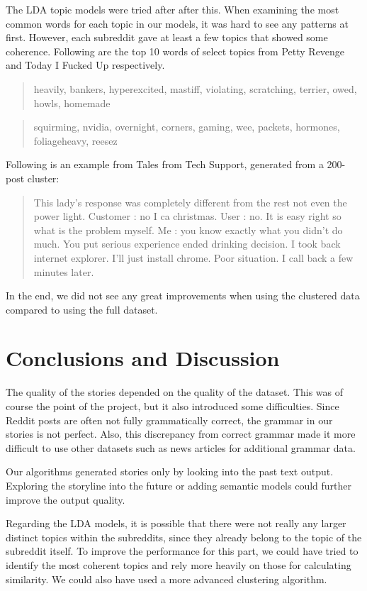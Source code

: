 \documentclass[12pt,a4paper,utf8]{article}
\begin{document}
The LDA topic models were tried after after this. When examining the most common words for each topic in our models, it was hard to see any patterns at first. However, each subreddit gave at least a few topics that showed some coherence. Following are the top 10 words of select topics from Petty Revenge and Today I Fucked Up respectively.
\begin{quotation}
heavily, bankers, hyperexcited, mastiff, violating, scratching, terrier, owed, howls, homemade
\end{quotation}
\begin{quotation}
squirming, nvidia, overnight, corners, gaming, wee, packets, hormones, foliageheavy, reesez
\end{quotation}
Following is an example from Tales from Tech Support, generated from a 200-post cluster:
\begin{quotation}
This lady's response was completely different from the rest not even the power light. Customer : no I ca christmas. User : no. It is easy right so what is the problem myself. Me : you know exactly what you didn't do much. You put serious experience ended drinking decision. I took back internet explorer. I'll just install chrome. Poor situation. I call back a few minutes later.
\end{quotation}
In the end, we did not see any great improvements when using the clustered data compared to using the full dataset.

\section{Conclusions and Discussion}
The quality of the stories depended on the quality of the dataset. This was of course the point of the project, but it also introduced some difficulties. Since Reddit posts are often not fully grammatically correct, the grammar in our stories is not perfect. Also, this discrepancy from correct grammar made it more difficult to use other datasets such as news articles for additional grammar data. 

Our algorithms generated stories only by looking into the past text output. Exploring the storyline into the future or adding semantic models could further improve the output quality.

Regarding the LDA models, it is possible that there were not really any larger distinct topics within the subreddits, since they already belong to the topic of the subreddit itself. To improve the performance for this part, we could have tried to identify the most coherent topics and rely more heavily on those for calculating similarity. We could also have used a more advanced clustering algorithm. 

\printbibliography[heading=bibnumbered]
\end{document}
